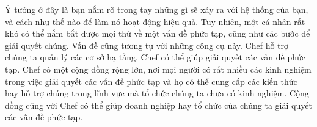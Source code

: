Ý tưởng ở đây là bạn nắm rõ trong tay những gì sẽ xảy ra với hệ thống của bạn, và cách như thế nào để làm nó hoạt động hiệu quả. Tuy nhiên, một cá nhân rất khó có thể nắm bắt được mọi thứ về một vấn đề phức tạp, cũng như các bước để giải quyết chúng. Vấn đề cũng tương tự với những công cụ này. Chef hỗ trợ chúng ta quản lý các cơ sở hạ tầng. Chef có thể giúp giải quyết các vấn đề phức tạp. Chef có một cộng đồng rộng lớn, nơi mọi người có rất nhiều các kinh nghiệm trong việc giải quyết các vấn đề phức tạp và họ có thể cung cấp các kiến thức hay hỗ trợ chúng trong lĩnh vực mà tổ chức chúng ta chưa có kinh nghiệm. Cộng đồng cũng với Chef có thể giúp doanh nghiệp hay tổ chức của chúng ta giải quyết các vấn đề phức tạp.
